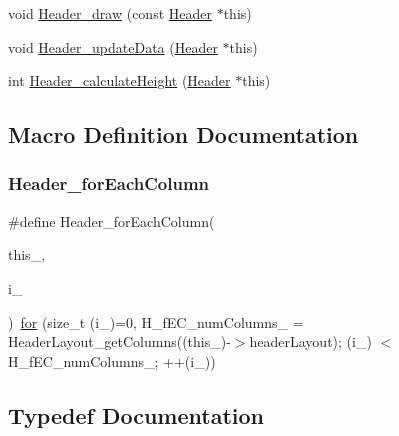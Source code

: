 \begin{DoxyCompactItemize}
\item 
void \hyperlink{linux_2download_2htop-3_83_80_2Header_8h_a8fdc16efdbdf77c599e2286925876790}{Header\+\_\+draw} (const \hyperlink{linux_2download_2htop-3_83_80_2Header_8h_a7f4dfcf80c34406946a7bda3d88d5e36}{Header} $\ast$this)
\item 
void \hyperlink{linux_2download_2htop-3_83_80_2Header_8h_a920f6f5b28ea524edde6e59c51ef5632}{Header\+\_\+update\+Data} (\hyperlink{linux_2download_2htop-3_83_80_2Header_8h_a7f4dfcf80c34406946a7bda3d88d5e36}{Header} $\ast$this)
\item 
int \hyperlink{linux_2download_2htop-3_83_80_2Header_8h_a617d51c6adc388c29bdbb1f5c8499d38}{Header\+\_\+calculate\+Height} (\hyperlink{linux_2download_2htop-3_83_80_2Header_8h_a7f4dfcf80c34406946a7bda3d88d5e36}{Header} $\ast$this)
\end{DoxyCompactItemize}


\subsection{Macro Definition Documentation}
\mbox{\label{linux_2download_2htop-3_83_80_2Header_8h_af27a88f94fb177b54dd3ff1f29b76615}} 
\subsubsection{\texorpdfstring{Header\+\_\+for\+Each\+Column}{Header\_forEachColumn}}
{\footnotesize\ttfamily \#define Header\+\_\+for\+Each\+Column(\begin{DoxyParamCaption}\item[{}]{this\+\_\+,  }\item[{}]{i\+\_\+ }\end{DoxyParamCaption})~\hyperlink{exo21_8cpp_a21d2815da7c583ec46e9b81638877e7b}{for} (size\+\_\+t (i\+\_\+)=0, H\+\_\+f\+E\+C\+\_\+num\+Columns\+\_\+ = Header\+Layout\+\_\+get\+Columns((this\+\_\+)-\/$>$header\+Layout); (i\+\_\+) $<$ H\+\_\+f\+E\+C\+\_\+num\+Columns\+\_\+; ++(i\+\_\+))}



\subsection{Typedef Documentation}
\mbox{\label{linux_2download_2htop-3_83_80_2Header_8h_a7f4dfcf80c34406946a7bda3d88d5e36}} 
